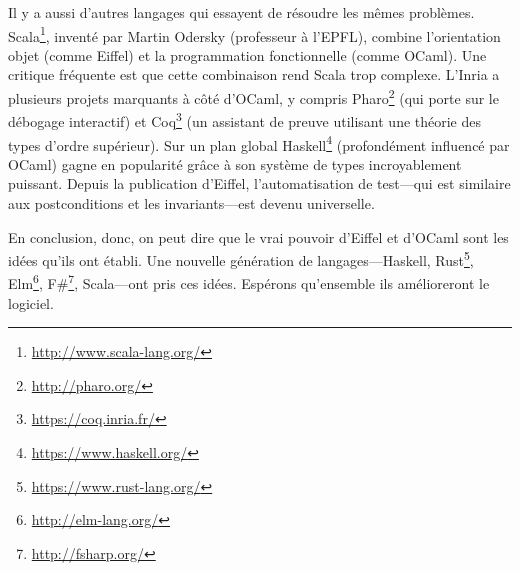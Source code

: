 \documentclass[french]{report}
\begin{document}
Il y a aussi d'autres langages qui essayent de résoudre les mêmes problèmes. Scala\footnote{\url{http://www.scala-lang.org/}}, inventé par Martin Odersky (professeur à l'\gls{EPFL}), combine l'orientation objet (comme Eiffel) et la programmation fonctionnelle (comme OCaml). Une critique fréquente est que cette combinaison rend Scala trop complexe. L'\gls{Inria} a plusieurs projets marquants à côté d'OCaml, y compris Pharo\footnote{\url{http://pharo.org/}} (qui porte sur le débogage interactif) et Coq\footnote{\url{https://coq.inria.fr/}} (un assistant de preuve utilisant une théorie des types d'ordre supérieur). Sur un plan global Haskell\footnote{\url{https://www.haskell.org/}} (profondément influencé par OCaml) gagne en popularité grâce à son système de types incroyablement puissant. Depuis la publication d'Eiffel, l'automatisation de test---qui est similaire aux postconditions et les invariants---est devenu universelle.

En conclusion, donc, on peut dire que le vrai pouvoir d'Eiffel et d'OCaml sont les idées qu'ils ont établi. Une nouvelle génération de langages---Haskell, Rust\footnote{\url{https://www.rust-lang.org/}}, Elm\footnote{\url{http://elm-lang.org/}}, F\#\footnote{\url{http://fsharp.org/}}, Scala---ont pris ces idées. Espérons qu'ensemble ils amélioreront le logiciel.

\printnoidxglossaries

\nocite{eiffeldocs}
\printbibliography
\end{document}
